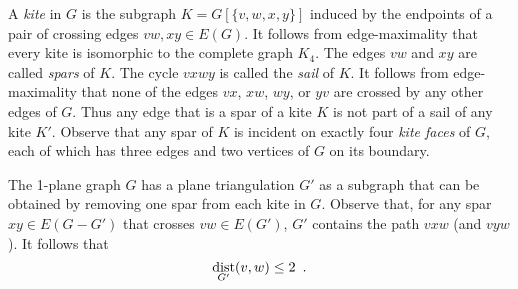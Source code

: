 \documentclass{patmorin}
\DeclareMathOperator{\dist}{dist}
\begin{document}
A \emph{kite} in $G$ is the subgraph $K=G[\{v,w,x,y\}]$ induced by the endpoints of a pair of crossing edges $vw,xy\in E(G)$.  It follows from edge-maximality that every kite is isomorphic to the complete graph $K_4$.
The edges $vw$ and $xy$ are called \emph{spars} of $K$.  The cycle $vxwy$ is called the \emph{sail} of $K$.  It follows from edge-maximality that none of the edges $vx$, $xw$, $wy$, or $yv$ are crossed by any other edges of $G$. Thus any edge that is a spar of a kite $K$ is not part of a sail of any kite $K'$. Observe that any spar of $K$ is incident on exactly four \emph{kite faces} of $G$, each of which has three edges and two vertices of $G$ on its boundary.

The 1-plane graph $G$ has a plane triangulation $G'$ as a subgraph that can be obtained by removing one spar from each kite in $G$.  Observe that, for any spar $xy\in E(G-G')$ that crosses $vw\in E(G')$, $G'$ contains the path $vxw$ (and $vyw$).  It follows that 
\begin{equation}
  \dist_{G'}(v,w)\le 2 \enspace . \eqlabel{spar-distance}
\end{equation}
\end{document}

